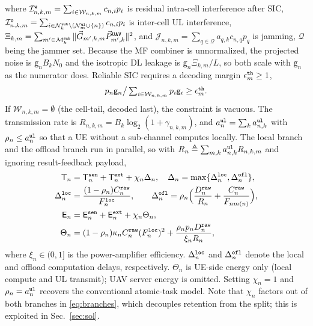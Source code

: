 \documentclass[journal]{IEEEtran}
\begin{document}
where $\mathcal{I}_{n,k,m}^{\tt w}=\sum_{i\in\mathcal{W}_{n,k,m}}c_{n,i} p_i$ is residual intra-cell interference after SIC,
$\mathcal{I}_{n,k,m}^{\tt o}=\sum_{i\in\mathcal{N}_k^{\tt sub}\setminus(\mathcal{N}_m^{\tt ul}\cup\{n\})}c_{n,i} p_i$ is inter-cell UL interference,
$\Xi_{k,m}=\sum_{m'\in\mathcal{M}_k^{\tt sub}}\Vert\vec{G}_{m',k,m}\vec{P}_{m',k}^{\tt UAV}\Vert^2$, and
$\mathcal{J}_{n,k,m}=\sum_{q\in\mathcal{Q}}a_{q,k}c_{n,q} p_q$ is jamming, $\mathcal{Q}$ being the jammer set. 
Because the MF combiner is unnormalized, the projected noise is $\mathsf{g}_nB_kN_0$ and the isotropic DL leakage is $\mathsf{g}_n\Xi_{k,m}/L$, so both scale with $\mathsf{g}_n$ as the numerator does.
Reliable SIC requires a decoding margin $\epsilon_m^{\tt th}\ge1$,
\begin{equation}
\textstyle p_n\mathsf{g}_n\big/\sum_{i\in\mathcal{W}_{n,k,m}}p_i\mathsf{g}_i\ge\epsilon_m^{\tt th}.
\label{eq:sic}
\end{equation}
{If $\mathcal{W}_{n,k,m}=\emptyset$ (the cell-tail, decoded last), the constraint is vacuous.}
The transmission rate is $R_{n,k,m}=B_k\log_2(1+\gamma_{n,k,m})$, and $a_n^{\tt ul}=\sum_k a_{n,k}^{\tt ul}$ with $\rho_n\le a_n^{\tt ul}$ so that a UE without a sub-channel computes locally. The local branch and the offload branch run in parallel, so with $R_n\triangleq\sum_{m,k}a_{n,k}^{\tt ul}R_{n,k,m}$ and ignoring result-feedback payload,
\begin{align}
\mathsf{T}_n&=\mathsf{T}_n^{\tt sen}+\mathsf{T}_n^{\tt ext}+\chi_n\Delta_n,
\quad
\Delta_n=\max\{\Delta_n^{\tt loc},\Delta_n^{\tt ofl}\},
\label{eq:Tn}\\
\Delta_n^{\tt loc}&=\frac{(1-\rho_n)C_n^{\tt raw}}{F_n^{\tt loc}},
\qquad
\Delta_n^{\tt ofl}=\rho_n\Big(\frac{D_n^{\tt raw}}{R_n}+\frac{C_n^{\tt raw}}{F_{n m(n)}}\Big),
\label{eq:branches}\\
\mathsf{E}_n&=\mathsf{E}_n^{\tt sen}+\mathsf{E}_n^{\tt ext}+\chi_n\Theta_n,
\label{eq:En}\\
\Theta_n&=(1-\rho_n)\kappa_n C_n^{\tt raw}(F_n^{\tt loc})^2+\frac{\rho_n p_n D_n^{\tt raw}}{\xi_n R_n},
\label{eq:Theta}
\end{align}
where $\xi_n\in(0,1]$ is the power-amplifier efficiency.
{$\Delta_n^{\tt loc}$ and $\Delta_n^{\tt ofl}$ denote the local and offload computation delays, respectively.}
$\Theta_n$ is UE-side energy only (local compute and UL transmit); UAV server energy is omitted.
Setting $\chi_n=1$ and $\rho_n=a_n^{\tt ul}$ recovers the conventional atomic-task model. Note that $\chi_n$ factors out of both branches in \eqref{eq:branches}, which decouples retention from the split; this is exploited in Sec.~\ref{sec:sol}.
\end{document}

